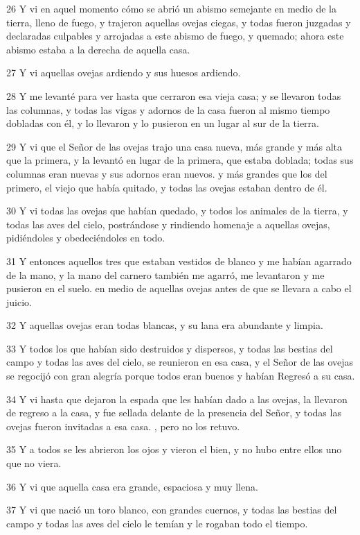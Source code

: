 \par 26 Y vi en aquel momento cómo se abrió un abismo semejante en medio de la tierra, lleno de fuego, y trajeron aquellas ovejas ciegas, y todas fueron juzgadas y declaradas culpables y arrojadas a este abismo de fuego, y quemado; ahora este abismo estaba a la derecha de aquella casa.
\par 27 Y vi aquellas ovejas ardiendo y sus huesos ardiendo.
\par 28 Y me levanté para ver hasta que cerraron esa vieja casa; y se llevaron todas las columnas, y todas las vigas y adornos de la casa fueron al mismo tiempo dobladas con él, y lo llevaron y lo pusieron en un lugar al sur de la tierra.
\par 29 Y vi que el Señor de las ovejas trajo una casa nueva, más grande y más alta que la primera, y la levantó en lugar de la primera, que estaba doblada; todas sus columnas eran nuevas y sus adornos eran nuevos. y más grandes que los del primero, el viejo que había quitado, y todas las ovejas estaban dentro de él.
\par 30 Y vi todas las ovejas que habían quedado, y todos los animales de la tierra, y todas las aves del cielo, postrándose y rindiendo homenaje a aquellas ovejas, pidiéndoles y obedeciéndoles en todo.
\par 31 Y entonces aquellos tres que estaban vestidos de blanco y me habían agarrado de la mano, y la mano del carnero también me agarró, me levantaron y me pusieron en el suelo. en medio de aquellas ovejas antes de que se llevara a cabo el juicio.
\par 32 Y aquellas ovejas eran todas blancas, y su lana era abundante y limpia.
\par 33 Y todos los que habían sido destruidos y dispersos, y todas las bestias del campo y todas las aves del cielo, se reunieron en esa casa, y el Señor de las ovejas se regocijó con gran alegría porque todos eran buenos y habían Regresó a su casa.
\par 34 Y vi hasta que dejaron la espada que les habían dado a las ovejas, la llevaron de regreso a la casa, y fue sellada delante de la presencia del Señor, y todas las ovejas fueron invitadas a esa casa. , pero no los retuvo.
\par 35 Y a todos se les abrieron los ojos y vieron el bien, y no hubo entre ellos uno que no viera.
\par 36 Y vi que aquella casa era grande, espaciosa y muy llena.
\par 37 Y vi que nació un toro blanco, con grandes cuernos, y todas las bestias del campo y todas las aves del cielo le temían y le rogaban todo el tiempo.
